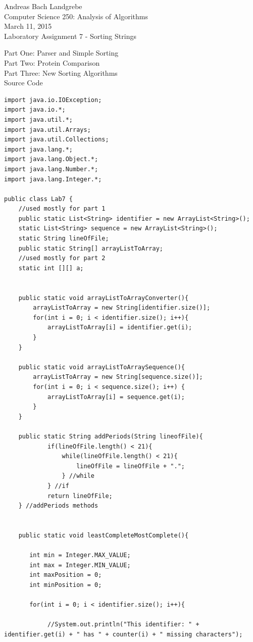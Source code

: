 \documentclass{article}
\begin{document}
\begin{center}
Andreas Bach Landgrebe \\
Computer Science 250: Analysis of Algorithms \\
March 11, 2015 \\
Laboratory Assignment 7 - Sorting Strings  \\
\end{center}
\newpage
\begin{center}
Part One: Parser and Simple Sorting \\
Part Two: Protein Comparison \\
Part Three: New Sorting Algorithms\\
Source Code
\end{center}
\begin{lstlisting}
import java.io.IOException; 
import java.io.*;
import java.util.*;
import java.util.Arrays;
import java.util.Collections;
import java.lang.*;
import java.lang.Object.*;
import java.lang.Number.*;
import java.lang.Integer.*;

public class Lab7 {
    //used mostly for part 1
	public static List<String> identifier = new ArrayList<String>();
	static List<String> sequence = new ArrayList<String>(); 
	static String lineOfFile;
	public static String[] arrayListToArray;
    //used mostly for part 2
	static int [][] a;


	public static void arrayListToArrayConverter(){
		arrayListToArray = new String[identifier.size()];
		for(int i = 0; i < identifier.size(); i++){
			arrayListToArray[i] = identifier.get(i);
		}
	}

	public static void arrayListToArraySequence(){
		arrayListToArray = new String[sequence.size()];
		for(int i = 0; i < sequence.size(); i++) {
			arrayListToArray[i] = sequence.get(i);
		}
	}

	public static String addPeriods(String lineofFile){
			if(lineOfFile.length() < 21){
				while(lineOfFile.length() < 21){
					lineOfFile = lineOfFile + ".";
				} //while
			} //if
			return lineOfFile;
	} //addPeriods methods


	public static void leastCompleteMostComplete(){

       int min = Integer.MAX_VALUE;
       int max = Integer.MIN_VALUE;
       int maxPosition = 0;
       int minPosition = 0;

       for(int i = 0; i < identifier.size(); i++){

            //System.out.println("This identifier: " + identifier.get(i) + " has " + counter(i) + " missing characters");


\end{lstlisting}
\end{document}
